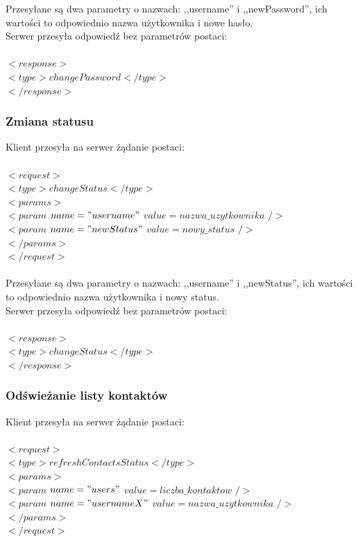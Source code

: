 \documentclass[a4paper,12pt]{article}
\begin{document}
\noindent Przesyłane są dwa parametry o nazwach: ,,username'' i ,,newPassword'', ich wartości to odpowiednio nazwa użytkownika i nowe hasło.\\
Serwer przesyła odpowiedź bez parametrów postaci:\\\\
\noindent  $<response>$\\
\indent    $<type>changePassword</type>$\\
$</response>$

\subsubsection[Zmiana statusu]{Zmiana statusu}
Klient przesyła na serwer żądanie postaci:\\\\
\noindent  $<request>$\\
\indent    $<type>changeStatus</type>$\\
\indent    $<params>$\\
\indent \indent $<param$ $name="username"$ $value=nazwa\_uzytkownika$ $/>$\\
\indent \indent $<param$ $name="newStatus"$ $value=nowy\_status$ $/>$\\
\indent    $</params>$\\
$</request>$\\\\

\noindent Przesyłane są dwa parametry o nazwach: ,,username'' i ,,newStatus'', ich wartości to odpowiednio nazwa użytkownika i nowy status.\\
Serwer przesyła odpowiedź bez parametrów postaci:\\\\
\noindent  $<response>$\\
\indent    $<type>changeStatus</type>$\\
$</response>$

\subsubsection[Odświeżanie listy kontaktów]{Odświeżanie listy kontaktów}
Klient przesyła na serwer żądanie postaci:\\\\
\noindent  $<request>$\\
\indent    $<type>refreshContactsStatus</type>$\\
\indent    $<params>$\\
\indent \indent $<param$ $name="users"$ $value=liczba\_kontaktow$ $/>$\\
\indent \indent $<param$ $name="usernameX"$ $value=nazwa\_uzytkownika$ $/>$\\
\indent    $</params>$\\
$</request>$\\\\
\end{document}
